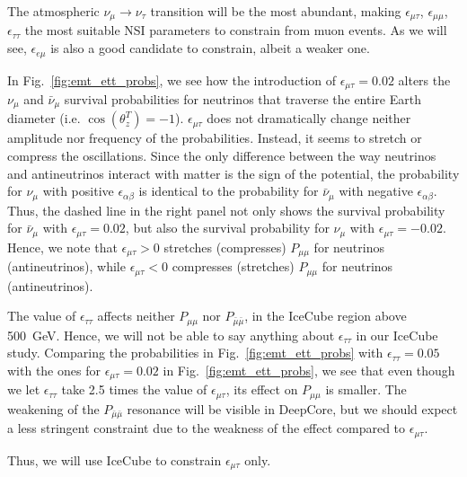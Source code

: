 \documentclass{article}
\newcommand{\ztrue}{\ensuremath{\cos{(\theta_z^{T})}}}
\newcommand{\emm}{\ensuremath{\epsilon_{\mu\mu}}}
\newcommand{\emt}{\ensuremath{\epsilon_{\mu\tau}}}
\newcommand{\eem}{\epsilon_{e\mu}}
\newcommand{\ett}{\ensuremath{\epsilon_{\tau\tau}}}
\newcommand{\nm}{\nu_\mu}
\newcommand{\nt}{\nu_\tau}
\newcommand{\anm}{\bar\nu_\mu}
\newcommand{\Pmm}{P_{\mu\mu}}
\newcommand{\Pamam}{P_{\bar{\mu}  \bar{\mu}}}
\begin{document}
The atmospheric $\nm \to \nt$ transition will be the most abundant, making $\emt$, $\emm$, $\ett$ the most suitable
NSI parameters to constrain from muon events. As we will see, $\eem$ is also a good candidate to constrain, albeit a weaker one. 

In Fig.~\ref{fig:emt_ett_probs}, we see how the introduction of $\emt = 0.02$ alters the $\nm$ and $\anm$ survival probabilities
for neutrinos that traverse the entire Earth diameter (i.e. $\ztrue = -1$). $\emt$ does not dramatically change neither
amplitude nor frequency of the probabilities. Instead, it seems to stretch or compress the oscillations. Since the 
only difference between the way neutrinos and antineutrinos interact with matter is the sign of the potential, the probability for
$\nm$ with positive $\epsilon_{\alpha\beta}$ is identical to the probability for $\anm$ with negative $\epsilon_{\alpha\beta}$. Thus, the dashed line 
in the right panel not only shows the survival probability for $\anm$ with $\emt=0.02$, but also the survival probability for $\nm$ with $\emt=-0.02$.
Hence, we note that $\emt > 0$ stretches (compresses) $\Pmm$ for neutrinos (antineutrinos), while $\emt < 0$ compresses (stretches) $\Pmm$ for neutrinos (antineutrinos).

The value of $\ett$ affects neither $\Pmm$ nor $\Pamam$, in the IceCube region above \SI{500}{\GeV}. Hence, we will not be able
to say anything about $\ett$ in our IceCube study.  Comparing the probabilities in Fig.~\ref{fig:emt_ett_probs} with $\ett = 0.05$ with the ones for $\emt = 0.02$ in Fig.~\ref{fig:emt_ett_probs},
we see that even though we let $\ett$ take 2.5 times the value of $\emt$, its effect on $\Pmm$ is smaller. The weakening of the $\Pamam$ resonance will be visible in DeepCore, but we should expect a less stringent 
constraint due to the weakness of the effect compared to $\emt$. 

Thus, we will use IceCube to constrain $\emt$ only.
\end{document}
